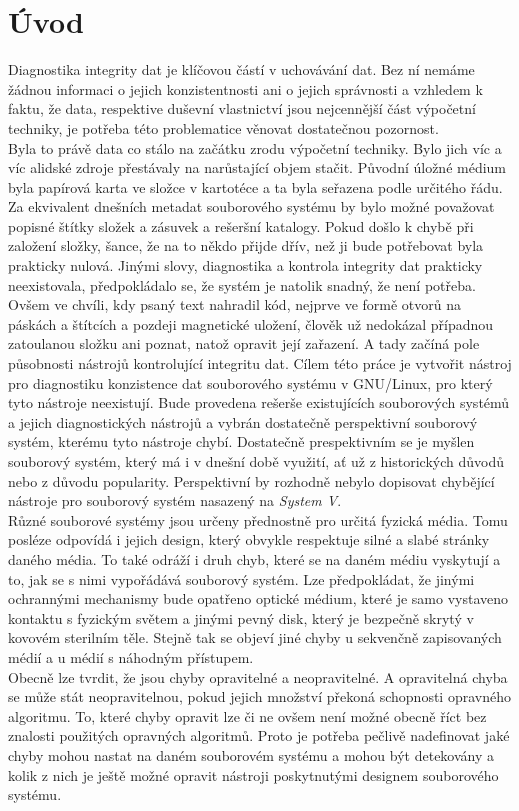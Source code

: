 \chapter*{Úvod}
{}

Diagnostika integrity dat je klíčovou částí v uchovávání dat. Bez ní nemáme žádnou informaci o jejich konzistentnosti ani o jejich správnosti a vzhledem k faktu, že data, respektive duševní vlastnictví jsou nejcennější část výpočetní techniky, je potřeba této problematice věnovat dostatečnou pozornost.\\
Byla to právě data co stálo na začátku zrodu výpočetní techniky. Bylo jich víc a víc alidské zdroje přestávaly na narůstající objem stačit. Původní úložné médium byla papírová karta ve složce v kartotéce a ta byla seřazena podle určitého řádu. Za ekvivalent dnešních metadat souborového systému by bylo možné považovat popisné štítky složek a zásuvek a rešeršní katalogy. Pokud došlo k chybě při založení složky, šance, že na to někdo přijde dřív, než ji bude potřebovat byla prakticky nulová. Jinými slovy, diagnostika a kontrola integrity dat prakticky neexistovala, předpokládalo se, že systém je natolik snadný, že není potřeba. Ovšem ve chvíli, kdy psaný text nahradil kód, nejprve ve formě otvorů na páskách a štítcích a pozdeji magnetické uložení, člověk už nedokázal případnou zatoulanou složku ani poznat, natož opravit její zařazení. A tady začíná pole působnosti nástrojů kontrolující integritu dat. 
Cílem této práce je vytvořit nástroj pro diagnostiku konzistence dat souborového systému v GNU/Linux, pro který tyto nástroje neexistují. Bude provedena rešerše existujících souborových systémů a jejich diagnostických nástrojů a vybrán dostatečně perspektivní souborový systém, kterému tyto nástroje chybí. Dostatečně prespektivním se je myšlen souborový systém, který má i v dnešní době využití, ať už z historických důvodů nebo z důvodu popularity. Perspektivní by rozhodně nebylo dopisovat chybějící nástroje pro souborový systém nasazený na \emph{System V}.\\
Různé souborové systémy jsou určeny přednostně pro určitá fyzická média. Tomu posléze odpovídá i jejich design, který obvykle respektuje silné a slabé stránky daného média. To také odráží i druh chyb, které se na daném médiu vyskytují a to, jak se s nimi vypořádává souborový systém. Lze předpokládat, že jinými ochrannými mechanismy bude opatřeno optické médium, které je samo vystaveno kontaktu s fyzickým světem a jinými pevný disk, který je bezpečně skrytý v kovovém sterilním těle. Stejně tak se objeví jiné chyby u sekvenčně zapisovaných médií a u médií s náhodným přístupem.\\
Obecně lze tvrdit, že jsou chyby opravitelné a neopravitelné. A opravitelná chyba se může stát neopravitelnou, pokud jejich množství překoná schopnosti opravného algoritmu. To, které chyby opravit lze či ne ovšem není možné obecně říct bez znalosti použitých opravných algoritmů. Proto je potřeba pečlivě nadefinovat jaké chyby mohou nastat na daném souborovém systému a mohou být detekovány a kolik z nich je ještě možné opravit nástroji poskytnutými designem souborového systému. 
